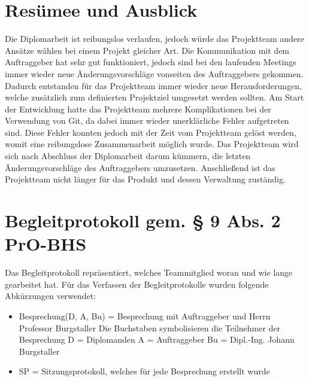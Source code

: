 \chapter{Resümee und Ausblick}
Die Diplomarbeit ist reibungslos verlaufen, jedoch würde das Projektteam andere Ansätze wählen bei einem Projekt gleicher Art. Die Kommunikation mit dem Auftraggeber hat sehr gut funktioniert, jedoch sind bei den laufenden Meetings immer wieder neue Änderungsvorschläge vonseiten des Auftraggebers gekommen. Dadurch entstanden für das Projektteam immer wieder neue Herausforderungen, welche zusätzlich zum definierten Projektziel umgesetzt werden sollten. Am Start der Entwicklung hatte das Projektteam mehrere Komplikationen bei der Verwendung von Git, da dabei immer wieder unerklärliche Fehler aufgetreten sind. Diese Fehler konnten jedoch mit der Zeit vom Projektteam gelöst werden, womit eine reibungslose Zusammenarbeit möglich wurde. Das Projektteam wird sich nach Abschluss der Diplomarbeit darum kümmern, die letzten Änderungsvorschläge des Auftraggebers umzusetzen. Anschließend ist das Projektteam nicht länger für das Produkt und dessen Verwaltung zuständig.



\printbibliography[heading=bibintoc,title={Quellen und Literatur}]

\listoffigures

\listoftables



\chapter{Begleitprotokoll gem. § 9 Abs. 2 PrO-BHS}
Das Begleitprotokoll repräsentiert, welches Teammitglied woran und wie lange gearbeitet hat. Für das Verfassen der Begleitprotokolle wurden folgende Abkürzungen verwendet: 
\begin{itemize}
	\item Besprechung(D, A, Bu) = Besprechung mit Auftraggeber und Herrn Professor Burgstaller
		\subitem Die Buchstaben symbolisieren die Teilnehmer der Besprechung 
		\subitem D = Diplomanden
		\subitem A = Auftraggeber
		\subitem Bu = Dipl.-Ing. Johann Burgstaller
	\item SP = Sitzungsprotokoll, welches für jede Besprechung erstellt wurde
	
	
\end{itemize}

\newpage
